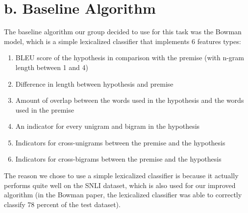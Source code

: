 \documentclass[12pt,letterpaper]{article}
\begin{document}
\section*{b. Baseline Algorithm}
The baseline algorithm our group decided to use for this task was the Bowman model, which is a simple lexicalized classifier that implements 6 features types: 
\begin{enumerate}
    \item BLEU score of the hypothesis in comparison with the premise (with n-gram length between 1 and 4)
    \item Difference in length between hypothesis and premise
    \item Amount of overlap between the words used in the hypothesis and the words used in the premise
    \item An indicator for every unigram and bigram in the hypothesis
    \item Indicators for cross-unigrams between the premise and the hypothesis
    \item Indicators for cross-bigrams between the premise and the hypothesis
\end{enumerate}
The reason we chose to use a simple lexicalized classifier is because it actually performs quite well on the SNLI dataset, which is also used for our improved algorithm (in the Bowman paper, the lexicalized classifier was able to correctly classify 78 percent of the test dataset). 
\end{document}
